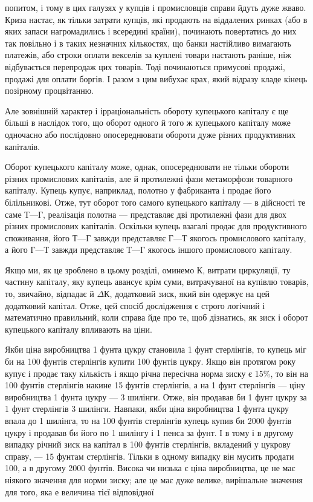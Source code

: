 \parcont{}  %
попитом, і тому в цих галузях у купців і промисловців справи
йдуть дуже жваво. Криза настає, як тільки затрати купців, які
продають на віддалених ринках (або в яких запаси нагромадились
і всередині країни), починають повертатись до них так
повільно і в таких незначних кількостях, що банки настійливо
вимагають платежів, або строки оплати векселів за куплені
товари настають раніше, ніж відбувається перепродаж цих
товарів. Тоді починаються примусові продажі, продажі для
оплати боргів. І разом з цим вибухає крах, який відразу кладе
кінець позірному процвітанню.

Але зовнішній характер і ірраціональність обороту купецького
капіталу є ще більші в наслідок того, що оборот одного й того ж
купецького капіталу може одночасно або послідовно опосереднювати
обороти дуже різних продуктивних капіталів.

Оборот купецького капіталу може, однак, опосереднювати
не тільки обороти різних промислових капіталів, але й протилежні
фази метаморфози товарного капіталу. Купець купує,
наприклад, полотно у фабриканта і продає його білільникові.
Отже, тут оборот того самого купецького капіталу — в дійсності
те саме $Т — Г$, реалізація полотна — представляє дві протилежні
фази для двох різних промислових капіталів. Оскільки
купець взагалі продає для продуктивного споживання, його
$Т — Г$ завжди представляє $Г — Т$ якогось промислового капіталу,
а його $Г — Т$ завжди представляє $Т — Г$ якогось іншого промислового
капіталу.

Якщо ми, як це зроблено в цьому розділі, оминемо $К$, витрати
циркуляції, ту частину капіталу, яку купець авансує крім
суми, витрачуваної на купівлю товарів, то, звичайно, відпадає
й $ΔК$, додатковий зиск, який він одержує на цей додатковий
капітал. Отже, цей спосіб дослідження є строго логічний і математично
правильний, коли справа йде про те, щоб дізнатись,
як зиск і оборот купецького капіталу впливають на ціни.

Якби ціна виробництва 1 фунта цукру становила 1 фунт
стерлінгів, то купець міг би на 100 фунтів стерлінгів купити
100 фунтів цукру. Якщо він протягом року купує і продає таку
кількість і якщо річна пересічна норма зиску є 15\%, то він
на 100 фунтів стерлінгів накине 15 фунтів стерлінгів, а на
1 фунт стерлінгів — ціну виробництва 1 фунта цукру — 3 шилінги.
Отже, він продавав би 1 фунт цукру за 1 фунт стерлінгів 3 шилінги.
Навпаки, якби ціна виробництва 1 фунта цукру впала до
1 шилінга, то на 100 фунтів стерлінгів купець купив би 2000 фунтів
цукру і продавав би його по 1 шилінгу і 1  пенса за фунт.
І в тому і в другому випадку річний зиск на капітал в 100 фунтів
стерлінгів, вкладений у цукрову справу, — 15 фунтам стерлінгів.
Тільки в одному випадку він мусить продати 100, а в другому
2000 фунтів. Висока чи низька є ціна виробництва, це не має
ніякого значення для норми зиску; але це має дуже велике,
вирішальне значення для того, яка е величина тієї відповідної
\parbreak{}  %
